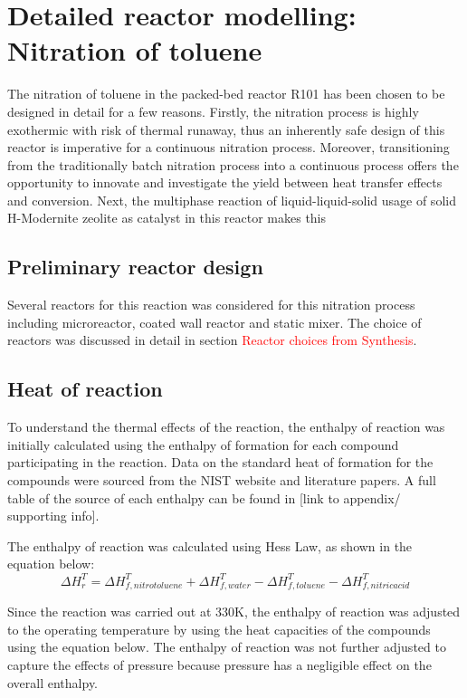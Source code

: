 \section{Detailed reactor modelling: Nitration of toluene}
The nitration of toluene in the packed-bed reactor R101 has been chosen to be designed in detail for a few reasons. Firstly, the nitration process is highly exothermic with risk of thermal runaway, thus an inherently safe design of this reactor is imperative for a continuous nitration process. Moreover, transitioning from the traditionally batch nitration process into a continuous process offers the opportunity to innovate and investigate the yield between heat transfer effects and conversion. Next, the multiphase reaction of liquid-liquid-solid usage of solid H-Modernite zeolite as catalyst in this reactor makes this 

\subsection{Preliminary reactor design}
Several reactors for this reaction was considered for this nitration process including microreactor, coated wall reactor and static mixer. The choice of reactors was discussed in detail in section \textcolor{red}{Reactor choices from Synthesis}.

\subsection{Heat of reaction}
To understand the thermal effects of the reaction, the enthalpy of reaction was initially calculated using the enthalpy of formation for each compound participating in the reaction. Data on the standard heat of formation for the compounds were sourced from the NIST website and literature papers. A full table of the source of each enthalpy can be found in [link to appendix/ supporting info]. 

The enthalpy of reaction was calculated using Hess Law, as shown in the equation below:
\begin{equation}
  \Delta H_{r}^{T} = \Delta H_{f,nitrotoluene}^{T} + \Delta H_{f,water}^{T} - \Delta H_{f,toluene}^{T} - \Delta H_{f,nitric acid}^{T}
\end{equation}

Since the reaction was carried out at 330K, the enthalpy of reaction was adjusted to the operating temperature by using the heat capacities of the compounds using the equation below. The enthalpy of reaction was not further adjusted to capture the effects of pressure because pressure has a negligible effect on the overall enthalpy. 

